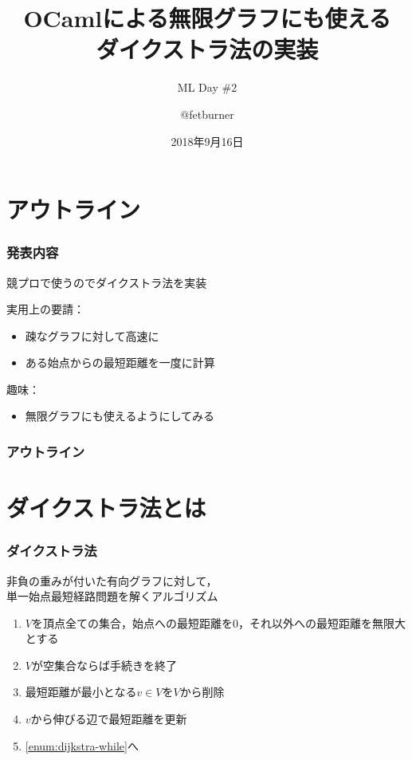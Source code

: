 \documentclass[dvipdfmx,cjk,xcolor=dvipsnames,envcountsect,notheorems,12pt]{beamer}
\title{OCamlによる無限グラフにも使える\\ダイクストラ法の実装}
\subtitle{ML Day \#2}
\author{@fetburner}
\date{2018年9月16日}
\theoremstyle{definition}
\begin{document}
\frame[plain]{\titlepage}%

\section*{アウトライン}

\begin{frame}
	\frametitle{発表内容}
	\Large
	\begin{center}
		競プロで使うのでダイクストラ法を実装
	\end{center}
	\vfill
	実用上の要請：
	\begin{itemize}
		\item 疎なグラフに対して高速に
		\item ある始点からの最短距離を一度に計算
	\end{itemize}
	\vfill
	趣味：
	\begin{itemize}
		\item 無限グラフにも使えるようにしてみる
	\end{itemize}
\end{frame}

\begin{frame}
  \frametitle{アウトライン}
	\begin{center}
		\begin{minipage}{.9\textwidth}
			\tableofcontents[sectionstyle=show,subsectionstyle=hide]
		\end{minipage}
	\end{center}
\end{frame}

\section{ダイクストラ法とは}

\begin{frame}
	\frametitle{ダイクストラ法}
	\Large
	\begin{center}
		非負の重みが付いた有向グラフに対して，\\単一始点最短経路問題を解くアルゴリズム
	\end{center}
	\vfill
	\begin{minipage}{\linewidth}
		\begin{block}{}
			\begin{enumerate}
				\item $V$を頂点全ての集合，始点への最短距離を0，それ以外への最短距離を無限大とする
				\item $V$が空集合ならば手続きを終了 \label{enum:dijkstra-while}
				\item 最短距離が最小となる$v\in V$を$V$から削除
				\item $v$から伸びる辺で最短距離を更新
				\item \ref{enum:dijkstra-while}へ
			\end{enumerate}
		\end{block}
	\end{minipage}
\end{frame}
\end{document}
